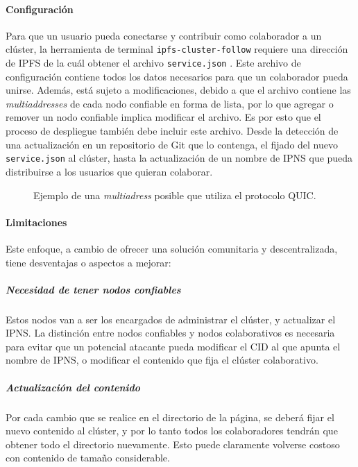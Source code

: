 \paragraph{Configuración} Para que un usuario pueda conectarse y contribuir como colaborador a un clúster, la herramienta de terminal \texttt{ipfs-cluster-follow} \cite{ipfs-cluster-follow} requiere una dirección de IPFS de la cuál obtener el archivo \texttt{service.json} \cite{service-json}. Este archivo de configuración contiene todos los datos necesarios para que un colaborador pueda unirse. Además, está sujeto a modificaciones, debido a que el archivo contiene las \textit{multiaddresses} \cite{multiaddr} de cada nodo confiable en forma de lista, por lo que agregar o remover un nodo confiable implica modificar el archivo. Es por esto que el proceso de despliegue también debe incluir este archivo. Desde la detección de una actualización en un repositorio de Git que lo contenga, el fijado del nuevo \texttt{service.json} al clúster, hasta la actualización de un nombre de IPNS que pueda distribuirse a los usuarios que quieran colaborar.

\begin{figure}[h]
\centering
{}
\caption{Ejemplo de una \textit{multiadress} posible que utiliza el protocolo QUIC.}
\end{figure}

\paragraph{Limitaciones}

Este enfoque, a cambio de ofrecer una solución comunitaria y descentralizada, tiene desventajas o aspectos a mejorar:

\subparagraph{Necesidad de tener nodos confiables} Estos nodos van a ser los encargados de administrar el clúster, y actualizar el IPNS. La distinción entre nodos confiables y nodos colaborativos es necesaria para evitar que un potencial atacante pueda modificar el CID al que apunta el nombre de IPNS, o modificar el contenido que fija el clúster colaborativo.
 
\subparagraph{Actualización del contenido} Por cada cambio que se realice en el directorio de la página, se deberá fijar el nuevo contenido al clúster, y por lo tanto todos los colaboradores tendrán que obtener todo el directorio nuevamente. Esto puede claramente volverse costoso con contenido de tamaño considerable.
    
